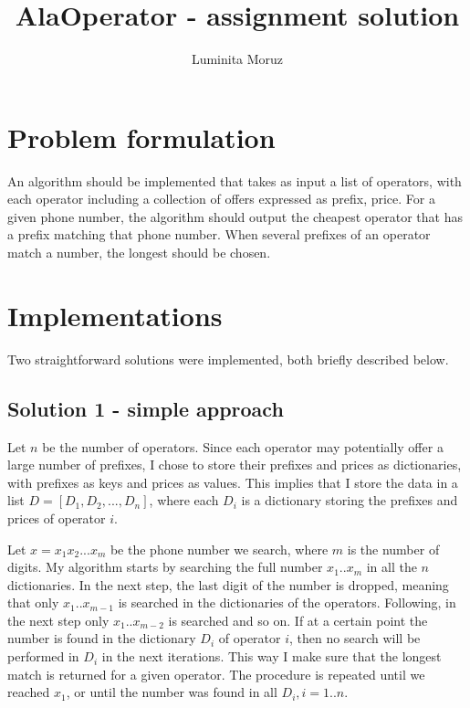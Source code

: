 \documentclass[12pt]{article}
\title{{\bf AlaOperator - assignment solution}}
\author{
Luminita Moruz  \\
}
\begin{document}
\maketitle

\section{Problem formulation}
\label{sec:problem}
An algorithm should be implemented that takes as input a list of
operators, with each operator including a collection of offers
expressed as prefix, price. For a given phone number, the algorithm
should output the cheapest operator that has a prefix matching that
phone number.  When several prefixes of an operator match a number,
the longest should be chosen.
 
\section{Implementations}
Two straightforward solutions were implemented, both briefly described
below.

\subsection{Solution 1 - simple approach}
Let $n$ be the number of operators. Since each operator may
potentially offer a large number of prefixes, I chose to store their
prefixes and prices as dictionaries, with prefixes as keys and prices
as values. This implies that I store the data in a list $D = [D_1,
  D_2, ..., D_n]$, where each $D_i$ is a dictionary storing the
prefixes and prices of operator $i$.

\vspace{0.2cm}

Let $x=x_1 x_2 ... x_m$ be the phone number we search, where $m$ is
the number of digits. My algorithm starts by searching the full number
$x_1 .. x_m$ in all the $n$ dictionaries. In the next step, the last
digit of the number is dropped, meaning that only $x_1 .. x_{m-1}$ is
searched in the dictionaries of the operators. Following, in the next
step only $x_1 .. x_{m-2}$ is searched and so on. If at a certain
point the number is found in the dictionary $D_i$ of operator $i$,
then no search will be performed in $D_i$ in the next iterations. This
way I make sure that the longest match is returned for a given
operator. The procedure is repeated until we reached $x_1$, or until
the number was found in all $D_i, i=1..n$.
\end{document}
